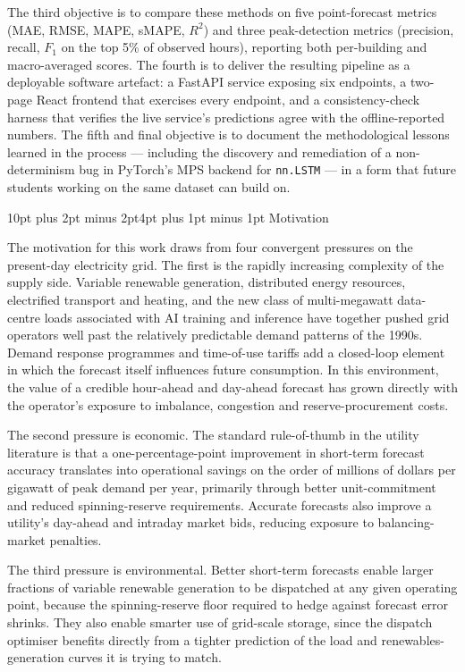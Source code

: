 \documentclass[12pt,a4paper,openany]{report}
\makeatletter
\renewcommand{\section}{\@startsection{section}{1}{\z@}%
  {10pt plus 2pt minus 2pt}{4pt plus 1pt minus 1pt}%
  {\normalfont\normalsize\bfseries}}
\makeatother
\begin{document}
The third objective is to compare these methods on five point-forecast metrics (MAE, RMSE, MAPE, sMAPE, $R^2$) and three peak-detection metrics (precision, recall, $F_1$ on the top 5\% of observed hours), reporting both per-building and macro-averaged scores. The fourth is to deliver the resulting pipeline as a deployable software artefact: a FastAPI service exposing six endpoints, a two-page React frontend that exercises every endpoint, and a consistency-check harness that verifies the live service's predictions agree with the offline-reported numbers. The fifth and final objective is to document the methodological lessons learned in the process --- including the discovery and remediation of a non-determinism bug in PyTorch's MPS backend for \texttt{nn.LSTM} --- in a form that future students working on the same dataset can build on.

\section{Motivation}

The motivation for this work draws from four convergent pressures on the present-day electricity grid. The first is the rapidly increasing complexity of the supply side. Variable renewable generation, distributed energy resources, electrified transport and heating, and the new class of multi-megawatt data-centre loads associated with AI training and inference have together pushed grid operators well past the relatively predictable demand patterns of the 1990s. Demand response programmes and time-of-use tariffs add a closed-loop element in which the forecast itself influences future consumption. In this environment, the value of a credible hour-ahead and day-ahead forecast has grown directly with the operator's exposure to imbalance, congestion and reserve-procurement costs.

The second pressure is economic. The standard rule-of-thumb in the utility literature is that a one-percentage-point improvement in short-term forecast accuracy translates into operational savings on the order of millions of dollars per gigawatt of peak demand per year, primarily through better unit-commitment and reduced spinning-reserve requirements. Accurate forecasts also improve a utility's day-ahead and intraday market bids, reducing exposure to balancing-market penalties.

The third pressure is environmental. Better short-term forecasts enable larger fractions of variable renewable generation to be dispatched at any given operating point, because the spinning-reserve floor required to hedge against forecast error shrinks. They also enable smarter use of grid-scale storage, since the dispatch optimiser benefits directly from a tighter prediction of the load and renewables-generation curves it is trying to match.
\end{document}
